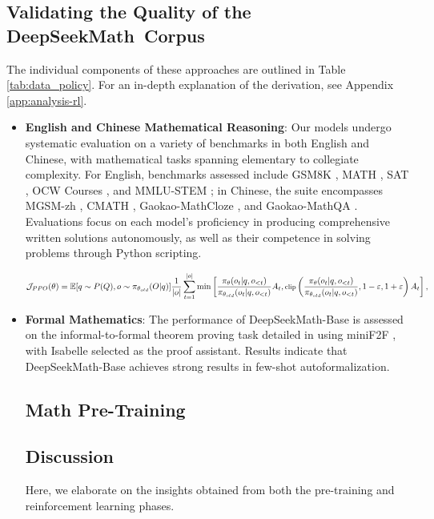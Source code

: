 \begin{itemize}[topsep=0pt]
\subsection{Validating the Quality of the DeepSeekMath~Corpus}

The individual components of these approaches are outlined in Table \ref{tab:data_policy}. For an in-depth explanation of the derivation, see Appendix \ref{app:analysis-rl}.

\begin{itemize}[topsep=0pt]
    \item \textbf{English and Chinese Mathematical Reasoning}: Our models undergo systematic evaluation on a variety of benchmarks in both English and Chinese, with mathematical tasks spanning elementary to collegiate complexity. For English, benchmarks assessed include GSM8K \citep{gsm8k}, MATH \citep{MATH}, SAT \citep{llemma}, OCW Courses \citep{minerva}, and MMLU-STEM \citep{mmlu}; in Chinese, the suite encompasses MGSM-zh \citep{mgsm}, CMATH \citep{wei2023cmath}, Gaokao-MathCloze \citep{agieval}, and Gaokao-MathQA \citep{agieval}. Evaluations focus on each model's proficiency in producing comprehensive written solutions autonomously, as well as their competence in solving problems through Python scripting.

\begin{equation}
\footnotesize
    \mathcal{J}_{PPO}(\theta) = \mathbb{E}{[q \sim P(Q), o \sim \pi_{\theta_{old}}(O|q)]} \frac{1}{|o|} \sum_{t=1}^{|o|} \min \left[ \frac{\pi_\theta(o_{t} | q, o_{<t})}{\pi_{\theta_{old}}(o_{t} | q, o_{<t})} A_{t}, \text{clip} \left( \frac{\pi_\theta(o_{t} | q, o_{<t})}{\pi_{\theta_{old}}(o_{t} | q, o_{<t})}, 1 - \varepsilon, 1 + \varepsilon \right)  A_{t} \right] ,
\end{equation}

\item \textbf{Formal Mathematics}: The performance of DeepSeekMath-Base is assessed on the informal-to-formal theorem proving task detailed in \citep{dsp_proof} using miniF2F \citep{minif2f}, with Isabelle \citep{isabelle} selected as the proof assistant. Results indicate that DeepSeekMath-Base achieves strong results in few-shot autoformalization.

\section{Math Pre-Training}

\section{Discussion}
Here, we elaborate on the insights obtained from both the pre-training and reinforcement learning phases.


\end{itemize}
\end{itemize}
